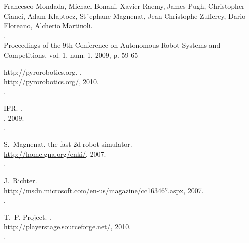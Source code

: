 \begin{thebibliography}{99}
{Francesco Mondada, Michael Bonani, Xavier Raemy, James Pugh, Christopher
  Cianci, Adam Klaptocz, St´ephane Magnenat, Jean-Christophe Zufferey, Dario
  Floreano, Alcherio Martinoli}.
\\.
\\\newblock Proceedings of the 9th Conference on Autonomous Robot Systems and Competitions, vol. 1, num. 1, 2009, p. 59-65

http://pyrorobotics.org.
.
\\\newblock \url{http://pyrorobotics.org/}, 2010.
\\.

IFR.
.
\\, 2009.
\\.

S.~Magnenat.
 the fast 2d robot simulator.
\\\newblock \url{http://home.gna.org/enki/}, 2007.
\\.

J.~Richter.
\\\newblock \url{http://msdn.microsoft.com/en-us/magazine/cc163467.aspx}, 2007.
\\.


T.~P. Project.
.
\\\newblock \url{http://playerstage.sourceforge.net/}, 2010.
\\.


\end{thebibliography}
